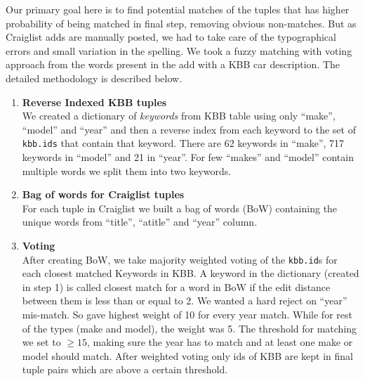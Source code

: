 \documentclass[dvips,11pt]{article}
\begin{document}
Our primary goal here is to find potential matches of the tuples that has higher probability of
being matched in final step, removing obvious non-matches. But as Craiglist adds are manually
posted, we had to take care of the typographical errors and small variation in the spelling.
We took a fuzzy matching with voting approach from the words present in the add with a KBB 
car description. The detailed methodology is described below.
\\[10pt]
\begin{enumerate}
\item {\bf Reverse Indexed KBB tuples} \\ We created a dictionary of {\em keywords} from KBB table using
  only ``make'', ``model'' and ``year'' and then a reverse index from each keyword to the set of
  {\tt kbb.ids} that contain that keyword. There are 62 keywords in ``make'', 717 keywords in ``model''
  and 21 in ``year''. For few ``makes'' and ``model'' contain multiple words we split them into two
  keywords.

\item {\bf Bag of words for Craiglist tuples} \\For each tuple in Craiglist we built a bag of words (BoW)
  containing the unique words from ``title'', ``atitle'' and ``year'' column.

\item {\bf Voting} \\After creating BoW, we take majority weighted voting of the {\tt kbb.id}s for
  each closest matched Keywords in KBB. A keyword in the dictionary (created in step 1) is called
  closest match for a word in BoW if the edit distance between them is less than or equal to 2. We
  wanted a hard reject on ``year'' mis-match. So gave highest weight of 10 for every year
  match. While for rest of the types (make and model), the weight was 5. The threshold for matching
  we set to $\ge 15$, making sure the year has to match and at least one make or model should match.
  After weighted voting only ids of KBB are kept in final tuple pairs which are above a
  certain threshold.

\end{enumerate}
\end{document}
